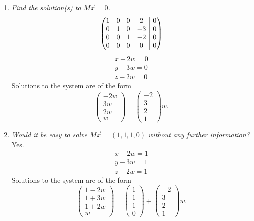 \documentclass[12pt]{article}
\makeatletter
\newenvironment{amatrix}[1]{%
  \left(\begin{array}{@{}*{#1}{c}|c@{}}
}{%
  \end{array}\right)
}
\makeatother
\begin{document}
\begin{enumerate}[label=(\alph*)]
	\item \textit{Find the solution(s) to $M\vec{x} = 0$.}
	\begin{equation*}
		\begin{amatrix}{4}
			1 & 0 & 0 & 2 & 0 \\
			0 & 1 & 0 & -3 & 0 \\
			0 & 0 & 1 & -2 & 0 \\
			0 & 0 & 0 & 0 & 0
		\end{amatrix}
	\end{equation*}
	\begin{gather*}
		x + 2w = 0 \\
		y - 3w = 0 \\
		z - 2w = 0
	\end{gather*}
	Solutions to the system are of the form
	\begin{equation*}
		\begin{pmatrix}
			-2w \\ 3w \\ 2w \\ w
		\end{pmatrix}
		=
		\boxed{
			\begin{pmatrix}
				-2 \\ 3 \\ 2 \\ 1
			\end{pmatrix}
			w
		}
		.
	\end{equation*}
	
	\item \textit{Would it be easy to solve $M\vec{x} = (1, 1, 1, 0)$ without
	any further information?} \\[\baselineskip]
	Yes.
	\begin{gather*}
		x + 2w = 1 \\
		y - 3w = 1 \\
		z - 2w = 1
	\end{gather*}
	Solutions to the system are of the form
	\begin{equation*}
		\begin{pmatrix}
			1 -2w \\ 1 + 3w \\ 1 + 2w \\ w
		\end{pmatrix}
		=
		\boxed{
			\begin{pmatrix}
				1 \\ 1 \\ 1 \\ 0
			\end{pmatrix}
			+
			\begin{pmatrix}
				-2 \\ 3 \\ 2 \\ 1
			\end{pmatrix}
			w
		}
		.
	\end{equation*}
	

\end{enumerate}
\end{document}

